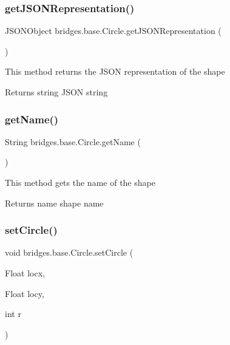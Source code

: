 \subsubsection{\texorpdfstring{getJSONRepresentation()}{getJSONRepresentation()}}
{\footnotesize\ttfamily J\+S\+O\+N\+Object bridges.\+base.\+Circle.\+get\+J\+S\+O\+N\+Representation (\begin{DoxyParamCaption}{ }\end{DoxyParamCaption})}

This method returns the J\+S\+ON representation of the shape

\begin{DoxyReturn}{Returns}
string J\+S\+ON string 
\end{DoxyReturn}
\mbox{\label{classbridges_1_1base_1_1_circle_a3782ea68f0419747c00bd8b2bfa31462}} 
\subsubsection{\texorpdfstring{getName()}{getName()}}
{\footnotesize\ttfamily String bridges.\+base.\+Circle.\+get\+Name (\begin{DoxyParamCaption}{ }\end{DoxyParamCaption})}

This method gets the name of the shape

\begin{DoxyReturn}{Returns}
name shape name 
\end{DoxyReturn}
\mbox{\label{classbridges_1_1base_1_1_circle_ab8c228507cbf3067c40d74e35563d1cf}} 
\subsubsection{\texorpdfstring{setCircle()}{setCircle()}}
{\footnotesize\ttfamily void bridges.\+base.\+Circle.\+set\+Circle (\begin{DoxyParamCaption}\item[{Float}]{locx,  }\item[{Float}]{locy,  }\item[{int}]{r }\end{DoxyParamCaption})}

